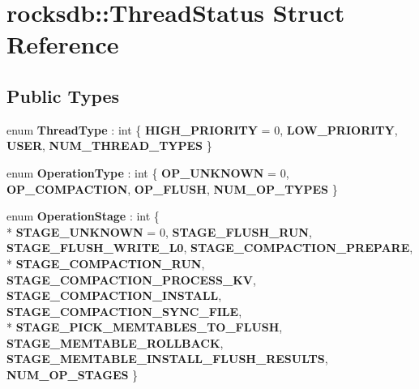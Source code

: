\hypertarget{structrocksdb_1_1ThreadStatus}{}\section{rocksdb\+:\+:Thread\+Status Struct Reference}
\label{structrocksdb_1_1ThreadStatus}
\subsection*{Public Types}
\begin{DoxyCompactItemize}
\item 
enum {\bfseries Thread\+Type} \+: int \{ {\bfseries H\+I\+G\+H\+\_\+\+P\+R\+I\+O\+R\+I\+TY} = 0, 
{\bfseries L\+O\+W\+\_\+\+P\+R\+I\+O\+R\+I\+TY}, 
{\bfseries U\+S\+ER}, 
{\bfseries N\+U\+M\+\_\+\+T\+H\+R\+E\+A\+D\+\_\+\+T\+Y\+P\+ES}
 \}\hypertarget{structrocksdb_1_1ThreadStatus_a090eabdbf76cc57240f9a2b3c738cd15}{}\label{structrocksdb_1_1ThreadStatus_a090eabdbf76cc57240f9a2b3c738cd15}

\item 
enum {\bfseries Operation\+Type} \+: int \{ {\bfseries O\+P\+\_\+\+U\+N\+K\+N\+O\+WN} = 0, 
{\bfseries O\+P\+\_\+\+C\+O\+M\+P\+A\+C\+T\+I\+ON}, 
{\bfseries O\+P\+\_\+\+F\+L\+U\+SH}, 
{\bfseries N\+U\+M\+\_\+\+O\+P\+\_\+\+T\+Y\+P\+ES}
 \}\hypertarget{structrocksdb_1_1ThreadStatus_a308f9bb3ccb870af7ca39a142901c183}{}\label{structrocksdb_1_1ThreadStatus_a308f9bb3ccb870af7ca39a142901c183}

\item 
enum {\bfseries Operation\+Stage} \+: int \{ \\*
{\bfseries S\+T\+A\+G\+E\+\_\+\+U\+N\+K\+N\+O\+WN} = 0, 
{\bfseries S\+T\+A\+G\+E\+\_\+\+F\+L\+U\+S\+H\+\_\+\+R\+UN}, 
{\bfseries S\+T\+A\+G\+E\+\_\+\+F\+L\+U\+S\+H\+\_\+\+W\+R\+I\+T\+E\+\_\+\+L0}, 
{\bfseries S\+T\+A\+G\+E\+\_\+\+C\+O\+M\+P\+A\+C\+T\+I\+O\+N\+\_\+\+P\+R\+E\+P\+A\+RE}, 
\\*
{\bfseries S\+T\+A\+G\+E\+\_\+\+C\+O\+M\+P\+A\+C\+T\+I\+O\+N\+\_\+\+R\+UN}, 
{\bfseries S\+T\+A\+G\+E\+\_\+\+C\+O\+M\+P\+A\+C\+T\+I\+O\+N\+\_\+\+P\+R\+O\+C\+E\+S\+S\+\_\+\+KV}, 
{\bfseries S\+T\+A\+G\+E\+\_\+\+C\+O\+M\+P\+A\+C\+T\+I\+O\+N\+\_\+\+I\+N\+S\+T\+A\+LL}, 
{\bfseries S\+T\+A\+G\+E\+\_\+\+C\+O\+M\+P\+A\+C\+T\+I\+O\+N\+\_\+\+S\+Y\+N\+C\+\_\+\+F\+I\+LE}, 
\\*
{\bfseries S\+T\+A\+G\+E\+\_\+\+P\+I\+C\+K\+\_\+\+M\+E\+M\+T\+A\+B\+L\+E\+S\+\_\+\+T\+O\+\_\+\+F\+L\+U\+SH}, 
{\bfseries S\+T\+A\+G\+E\+\_\+\+M\+E\+M\+T\+A\+B\+L\+E\+\_\+\+R\+O\+L\+L\+B\+A\+CK}, 
{\bfseries S\+T\+A\+G\+E\+\_\+\+M\+E\+M\+T\+A\+B\+L\+E\+\_\+\+I\+N\+S\+T\+A\+L\+L\+\_\+\+F\+L\+U\+S\+H\+\_\+\+R\+E\+S\+U\+L\+TS}, 
{\bfseries N\+U\+M\+\_\+\+O\+P\+\_\+\+S\+T\+A\+G\+ES}
 \}\hypertarget{structrocksdb_1_1ThreadStatus_a6e994cfba8171145a4a646b2025145f5}{}\label{structrocksdb_1_1ThreadStatus_a6e994cfba8171145a4a646b2025145f5}


\end{DoxyCompactItemize}
